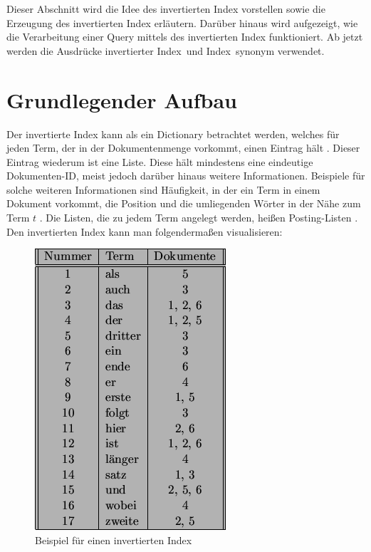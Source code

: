 Dieser Abschnitt wird die Idee des invertierten Index vorstellen sowie die Erzeugung des invertierten Index erläutern. Darüber hinaus wird aufgezeigt, wie die Verarbeitung einer Query mittels des invertierten Index funktioniert. Ab jetzt werden die Ausdrücke \glqq invertierter Index\grqq\ und \glqq Index\grqq\ synonym verwendet.
\section{Grundlegender Aufbau}
Der invertierte Index kann als ein Dictionary betrachtet werden, welches für jeden Term, der in der Dokumentenmenge vorkommt, einen Eintrag hält \cite{IR_Intro_Cambridge} \cite{IR_Uni_Bamberg}. Dieser Eintrag wiederum ist eine Liste. Diese hält mindestens eine eindeutige Dokumenten-ID, meist jedoch darüber hinaus weitere Informationen. Beispiele für solche weiteren Informationen sind Häufigkeit, in der ein Term in einem Dokument vorkommt, die Position und die umliegenden Wörter in der Nähe zum Term $t$ \cite{IR_Intro_Cambridge}.
Die Listen, die zu jedem Term angelegt werden, heißen Posting-Listen \cite{IR_Intro_Cambridge}.
\newline
Den invertierten Index kann man folgendermaßen visualisieren:
\begin{figure}[H]
	\centering
	\includegraphics[scale=0.5]{../Abbildungen/index.png}
	\caption{Beispiel für einen invertierten Index \cite{index_Uni_Munich}}
\end{figure}


